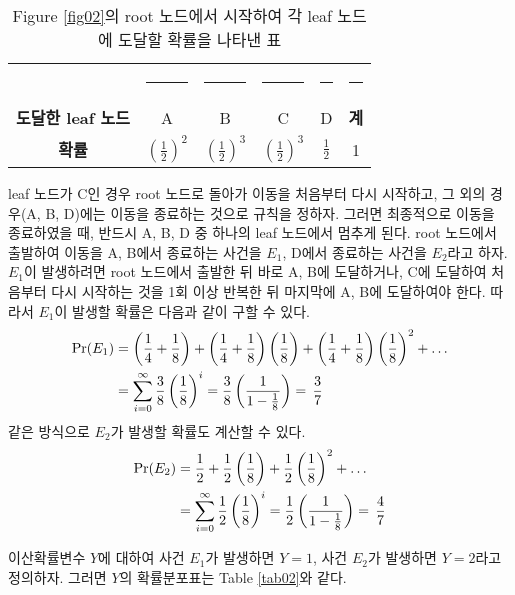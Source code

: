 \documentclass[11pt]{article}
\begin{document}
\begin{table}[h]
\centering
\begin{tabular}{cccccc}
\toprule
 & \rule{1cm}{0pt} & \rule{1cm}{0pt} & \rule{1cm}{0pt} & \rule{1cm}{0pt} & \rule{0.5cm}{0pt} \\[-\arraystretch\normalbaselineskip]
\textbf{도달한 leaf 노드} & A & B & C & D & \textbf{계} \\
\midrule
\textbf{확률} & $\displaystyle \left(\frac{1}{2}\right)^2$ & $\displaystyle \left(\frac{1}{2}\right)^3$ & $\displaystyle \left(\frac{1}{2}\right)^3$ & $\displaystyle \frac{1}{2}$ & 1 \\
\bottomrule
\end{tabular}
\caption{Figure \ref{fig02}의 root 노드에서 시작하여 각 leaf 노드에 도달할 확률을 나타낸 표}
\label{tab01}
\end{table}
 leaf 노드가 C인 경우 root 노드로 돌아가 이동을 처음부터 다시 시작하고, 그 외의 경우(A, B, D)에는 이동을 종료하는 것으로 규칙을 정하자. 그러면 최종적으로 이동을 종료하였을 때, 반드시 A, B, D 중 하나의 leaf 노드에서 멈추게 된다. root 노드에서 출발하여 이동을 A, B에서 종료하는 사건을 ${E}_{1}$, D에서 종료하는 사건을 ${E}_{2}$라고 하자. ${E}_{1}$이 발생하려면 root 노드에서 출발한 뒤 바로 A, B에 도달하거나, C에 도달하여 처음부터 다시 시작하는 것을 1회 이상 반복한 뒤 마지막에 A, B에 도달하여야 한다. 따라서 ${E}_{1}$이 발생할 확률은 다음과 같이 구할 수 있다.
\[
\begin{split}
\textnormal{Pr}(E_{1}) & = \left(\frac{1}{4} + \frac{1}{8}\right)
+ \left(\frac{1}{4} + \frac{1}{8}\right)\left(\frac{1}{8}\right)
+ \left(\frac{1}{4} + \frac{1}{8}\right)\left(\frac{1}{8}\right)^2 + \ldots \\
& = \sum_{i=0}^{\infty} \frac{3}{8}\left(\frac{1}{8}\right)^i = \frac{3}{8}\left(\frac{1}{1 - \frac{1}{8}}\right) = \,\frac{3}{7}
\end{split}
\]
같은 방식으로 ${E}_{2}$가 발생할 확률도 계산할 수 있다.
\[
\begin{split}
\textnormal{Pr}(E_{2}) & = \frac{1}{2}
+ \frac{1}{2}\left(\frac{1}{8}\right)
+ \frac{1}{2}\left(\frac{1}{8}\right)^2 + \ldots \\
& = \sum_{i=0}^{\infty} \frac{1}{2}\left(\frac{1}{8}\right)^i = \frac{1}{2}\left(\frac{1}{1 - \frac{1}{8}}\right) = \,\frac{4}{7}
\end{split}
\]

이산확률변수 $Y$에 대하여 사건 $E_{1}$가 발생하면 $Y=1$, 사건 $E_{2}$가 발생하면 $Y=2$라고 정의하자. 그러면 $Y$의 확률분포표는 Table \ref{tab02}와 같다.
\end{document}
